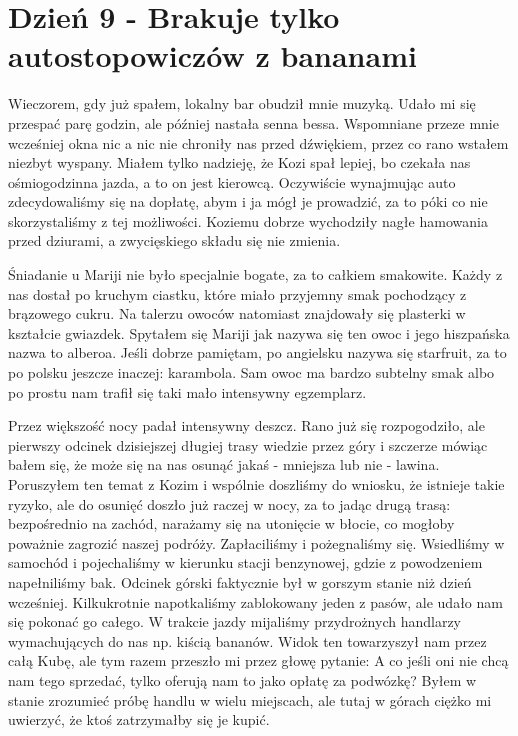 
\chapter[Brakuje tylko autostopowiczów z bananami]{Dzień 9 - Brakuje tylko autostopowiczów z bananami}

Wieczorem, gdy już spałem, lokalny bar obudził mnie muzyką.
Udało mi się przespać parę godzin, ale później nastała senna bessa.
Wspomniane przeze mnie wcześniej okna nic a nic nie chroniły nas przed dźwiękiem, przez co rano wstałem niezbyt wyspany.
Miałem tylko nadzieję, że Kozi spał lepiej, bo czekała nas ośmiogodzinna jazda, a to on jest kierowcą.
Oczywiście wynajmując auto zdecydowaliśmy się na dopłatę, abym i ja mógł je prowadzić, za to póki co nie skorzystaliśmy z tej możliwości.
Koziemu dobrze wychodziły nagłe hamowania przed dziurami, a zwycięskiego składu się nie zmienia.
\par Śniadanie u Mariji nie było specjalnie bogate, za to całkiem smakowite.
Każdy z nas dostał po kruchym ciastku, które miało przyjemny smak pochodzący z brązowego cukru.
Na talerzu owoców natomiast znajdowały się plasterki w kształcie gwiazdek.
Spytałem się Mariji jak nazywa się ten owoc i jego hiszpańska nazwa to alberoa.
Jeśli dobrze pamiętam, po angielsku nazywa się starfruit, za to po polsku jeszcze inaczej: karambola. Sam owoc ma bardzo subtelny smak albo po prostu nam trafił się taki mało intensywny egzemplarz.
\par Przez większość nocy padał intensywny deszcz.
Rano już się rozpogodziło, ale pierwszy odcinek dzisiejszej długiej trasy wiedzie przez góry i szczerze mówiąc bałem się, że może się na nas osunąć jakaś - mniejsza lub nie - lawina.
Poruszyłem ten temat z Kozim i wspólnie doszliśmy do wniosku, że istnieje takie ryzyko, ale do osunięć doszło już raczej w nocy, za to jadąc drugą trasą: bezpośrednio na zachód, narażamy się na utonięcie w błocie, co mogłoby poważnie zagrozić naszej podróży.
Zapłaciliśmy i pożegnaliśmy się.
Wsiedliśmy w samochód i pojechaliśmy w kierunku stacji benzynowej, gdzie z powodzeniem napełniliśmy bak.
Odcinek górski faktycznie był w gorszym stanie niż dzień wcześniej.
Kilkukrotnie napotkaliśmy zablokowany jeden z pasów, ale udało nam się pokonać go całego.
W trakcie jazdy mijaliśmy przydrożnych handlarzy wymachujących do nas np.
kiścią bananów.
Widok ten towarzyszył nam przez całą Kubę, ale tym razem przeszło mi przez głowę pytanie: A co jeśli oni nie chcą nam tego sprzedać, tylko oferują nam to jako opłatę za podwózkę?
Byłem w stanie zrozumieć próbę handlu w wielu miejscach, ale tutaj w górach ciężko mi uwierzyć, że ktoś zatrzymałby się je kupić.
